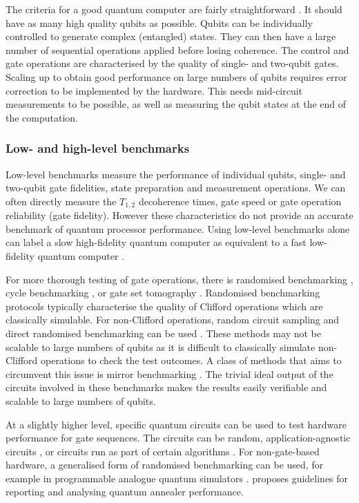 \documentclass[10pt]{iopart}
\begin{document}
The criteria for a good quantum computer are fairly straightforward \cite{DiVincenzo2000}. It should have as many high quality qubits as possible. Qubits can be individually controlled to generate complex (entangled) states. They can then have a large number of sequential operations applied before losing coherence. The control and gate operations are characterised by the quality of single- and two-qubit gates. Scaling up to obtain good performance on large numbers of qubits requires error correction \cite{Terhal2015} to be implemented by the hardware. This needs mid-circuit measurements to be possible, as well as measuring the qubit states at the end of the computation.


\subsubsection{Low- and high-level benchmarks}\label{sec:lowhighbenchmarks}\hfill

Low-level benchmarks measure the performance of individual qubits, single- and two-qubit gate fidelities, state preparation and measurement operations. We can often directly measure the $T_{1,2}$ decoherence times, gate speed or gate operation reliability (gate fidelity). However these characteristics do not provide an accurate benchmark of quantum processor performance. Using low-level benchmarks alone can label a slow high-fidelity quantum computer as equivalent to a fast low-fidelity quantum computer \cite{Campbell2017a}. 

For more thorough testing of gate operations, there is randomised benchmarking \cite{Knill2008,Magesan2011}, cycle benchmarking \cite{Erhard2019a}, or gate set tomography \cite{Nielsen2021}. Randomised benchmarking protocols typically characterise the quality of Clifford operations which are classically simulable. For non-Clifford operations, random circuit sampling and direct randomised benchmarking can be used \cite{Liu2022b,Proctor2019}. These methods may not be scalable to large numbers of qubits as it is difficult to classically simulate non-Clifford operations to check the test outcomes. A class of methods that aims to circumvent this issue is mirror benchmarking \cite{Proctor2021, Mayer2021}. The trivial ideal output of the circuits involved in these benchmarks makes the results easily verifiable and scalable to large numbers of qubits.

At a slightly higher level, specific quantum circuits can be used to test hardware performance for gate sequences. The circuits can be random, application-agnostic circuits \cite{Cross2019,Proctor2022}, or circuits run as part of certain algorithms \cite{Mills2021,Quetschlich2023,Li2022b}. For non-gate-based hardware, a generalised form of randomised benchmarking can be used, for example in programmable analogue quantum simulators \cite{Derbyshire2020,Jackson2023}. \citeauthor{McGeoch2019} \cite{McGeoch2019} proposes guidelines for reporting and analysing quantum annealer performance. 
\end{document}
